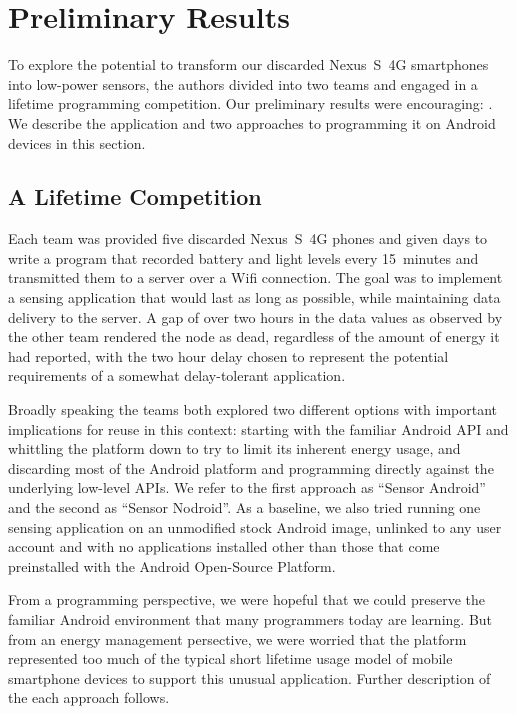 \section{Preliminary Results}
\label{sec-results}

To explore the potential to transform our discarded Nexus~S~4G smartphones
into low-power sensors, the authors divided into two teams and engaged in a
lifetime programming competition. Our preliminary results were encouraging:
. We describe the application and two approaches to
programming it on Android devices in this section.

\subsection{A Lifetime Competition}

Each team was provided five discarded Nexus~S~4G phones and given
 days to write a program that recorded battery and light
levels every 15~minutes and transmitted them to a server over a Wifi
connection. The goal was to implement a sensing application that would last
as long as possible, while maintaining data delivery to the server. A gap of
over two hours in the data values as observed by the other team rendered the
node as dead, regardless of the amount of energy it had reported, with the
two hour delay chosen to represent the potential requirements of a somewhat
delay-tolerant application.

Broadly speaking the teams both explored two different options with important
implications for reuse in this context: starting with the familiar Android
API and whittling the platform down to try to limit its inherent energy
usage, and discarding most of the Android platform and programming directly
against the underlying low-level APIs. We refer to the first approach as
``Sensor Android'' and the second as ``Sensor Nodroid''. As a baseline, we
also tried running one sensing application on an unmodified stock Android
image, unlinked to any user account and with no applications installed other
than those that come preinstalled with the Android Open-Source Platform.

From a programming perspective, we were hopeful that we could preserve the
familiar Android environment that many programmers today are learning. But
from an energy management persective, we were worried that the platform
represented too much of the typical short lifetime usage model of mobile
smartphone devices to support this unusual application. Further description
of the each approach follows.

